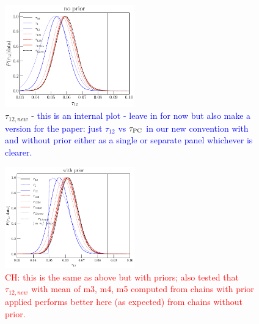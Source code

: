 \documentclass[prd,twocolumn,amsmath,amssymb,floatfix,superscriptaddress,nofootinbib]{revtex4-1}
\newcommand{\wh}[1]{\textcolor{blue}{#1}}
\newcommand{\ch}[1]{\textcolor{red}{#1}}
\begin{document}
{\begin{figure}[ht]
\includegraphics[width=0.5\textwidth]{results/tau_pc_decomposition/plot_taumj_decomposition_apply_cut_False_pl18_pc_zmax30_pliklite_srollv2_1015.pdf}
\caption{$\tau_{12,new}$ - \wh{this is an internal plot - leave in for now but also make a version for the paper: just $\tau_{12}$ vs $\tau_{\rm PC}$ in our new convention with and without prior either as a single or separate panel whichever is clearer.}}
\label{fig:tau12}
\end{figure}

\begin{figure}[ht]
\includegraphics[width=0.5\textwidth]{results/tau_pc_decomposition/plot_taumj_decomposition_apply_cut_True_pl18_pc_zmax30_pliklite_srollv2_1015.pdf}
\caption{ \ch{CH: this is the same as above but with priors; also tested that $\tau_{12, new}$ with mean of m3, m4, m5 computed from chains with prior applied performs better here (as expected) from chains without prior.}}
\label{fig:tau12}
\end{figure}

}
\end{document}
